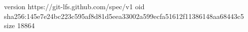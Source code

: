 version https://git-lfs.github.com/spec/v1
oid sha256:145e7e24bc223c595af8d81d5eea33002a599ecfa51612f11386148aa68443c5
size 18864

